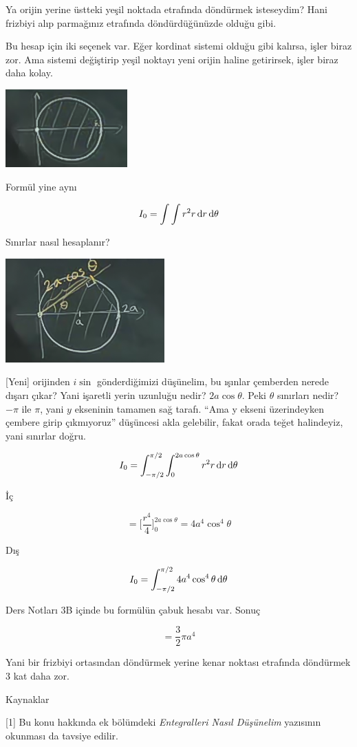 \documentclass[12pt,fleqn]{article}\usepackage{../../common}
\begin{document}
Ya orijin yerine üstteki yeşil noktada etrafında döndürmek isteseydim? Hani
frizbiyi alıp parmağınız etrafında döndürdüğünüzde olduğu gibi.

Bu hesap için iki seçenek var. Eğer kordinat sistemi olduğu gibi kalırsa, işler
biraz zor. Ama sistemi değiştirip yeşil noktayı yeni orijin haline getirirsek,
işler biraz daha kolay.

\includegraphics[height=3cm]{17_9.png}

Formül yine aynı

$$ I_0 = \int \int r^2 r \,\mathrm{d} r \,\mathrm{d}\theta $$

Sınırlar nasıl hesaplanır? 

\includegraphics[height=4cm]{17_10.png}

[Yeni] orijinden $i\sin$ gönderdiğimizi düşünelim, bu ışınlar çemberden nerede
dışarı çıkar? Yani işaretli yerin uzunluğu nedir? $2a \cos\theta$. Peki
$\theta$ sınırları nedir? $-\pi$ ile $\pi$, yani $y$ ekseninin tamamen sağ
tarafı. ``Ama y ekseni üzerindeyken çembere girip çıkmıyoruz'' düşüncesi
akla gelebilir, fakat orada teğet halindeyiz, yani sınırlar doğru. 

$$ I_0 = \int_{-\pi/2}^{\pi/2} \int_0^{2a \cos\theta} r^2 r \,\mathrm{d} r \,\mathrm{d}\theta $$

İç

$$ = \bigg[ \frac{r^4}{4} \bigg]_{0}^{2a \cos\theta} =
4a^4 \cos^4\theta
$$

Dış

$$ I_0 = \int_{-\pi/2}^{\pi/2} 4a^4 \cos^4\theta \,\mathrm{d}\theta $$

Ders Notları 3B içinde bu formülün çabuk hesabı var. Sonuç

$$  = \frac{3}{2} \pi a^4 $$

Yani bir frizbiyi ortasından döndürmek yerine kenar noktası etrafında
döndürmek 3 kat daha zor. 

Kaynaklar

[1] Bu konu hakkında ek bölümdeki {\em Entegralleri Nasıl Düşünelim}
yazısının okunması da tavsiye edilir.
\end{document}
